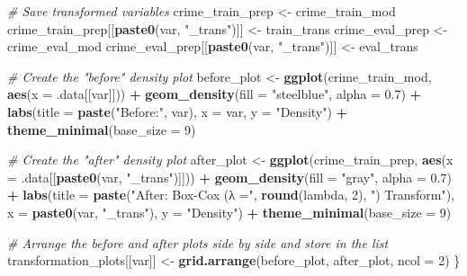 \documentclass[
]{article}
\newenvironment{Shaded}{\begin{snugshade}}{\end{snugshade}}
\newcommand{\AttributeTok}[1]{\textcolor[rgb]{0.13,0.29,0.53}{#1}}
\newcommand{\CommentTok}[1]{\textcolor[rgb]{0.56,0.35,0.01}{\textit{#1}}}
\newcommand{\DecValTok}[1]{\textcolor[rgb]{0.00,0.00,0.81}{#1}}
\newcommand{\FloatTok}[1]{\textcolor[rgb]{0.00,0.00,0.81}{#1}}
\newcommand{\FunctionTok}[1]{\textcolor[rgb]{0.13,0.29,0.53}{\textbf{#1}}}
\newcommand{\NormalTok}[1]{#1}
\newcommand{\OtherTok}[1]{\textcolor[rgb]{0.56,0.35,0.01}{#1}}
\newcommand{\SpecialCharTok}[1]{\textcolor[rgb]{0.81,0.36,0.00}{\textbf{#1}}}
\newcommand{\StringTok}[1]{\textcolor[rgb]{0.31,0.60,0.02}{#1}}
\begin{document}
\begin{Shaded}
\begin{Highlighting}[]
  \CommentTok{\# Save transformed variables}
\NormalTok{  crime\_train\_prep }\OtherTok{\textless{}{-}}\NormalTok{ crime\_train\_mod}
\NormalTok{  crime\_train\_prep[[}\FunctionTok{paste0}\NormalTok{(var, }\StringTok{"\_trans"}\NormalTok{)]] }\OtherTok{\textless{}{-}}\NormalTok{ train\_trans}
\NormalTok{  crime\_eval\_prep }\OtherTok{\textless{}{-}}\NormalTok{ crime\_eval\_mod}
\NormalTok{  crime\_eval\_prep[[}\FunctionTok{paste0}\NormalTok{(var, }\StringTok{"\_trans"}\NormalTok{)]] }\OtherTok{\textless{}{-}}\NormalTok{ eval\_trans}
  
  \CommentTok{\# Create the "before" density plot}
\NormalTok{  before\_plot }\OtherTok{\textless{}{-}} \FunctionTok{ggplot}\NormalTok{(crime\_train\_mod, }\FunctionTok{aes}\NormalTok{(}\AttributeTok{x =}\NormalTok{ .data[[var]])) }\SpecialCharTok{+}
    \FunctionTok{geom\_density}\NormalTok{(}\AttributeTok{fill =} \StringTok{"steelblue"}\NormalTok{, }\AttributeTok{alpha =} \FloatTok{0.7}\NormalTok{) }\SpecialCharTok{+}
    \FunctionTok{labs}\NormalTok{(}\AttributeTok{title =} \FunctionTok{paste}\NormalTok{(}\StringTok{"Before:"}\NormalTok{, var),}
         \AttributeTok{x =}\NormalTok{ var, }\AttributeTok{y =} \StringTok{"Density"}\NormalTok{) }\SpecialCharTok{+}
    \FunctionTok{theme\_minimal}\NormalTok{(}\AttributeTok{base\_size =} \DecValTok{9}\NormalTok{)}
  
  \CommentTok{\# Create the "after" density plot}
\NormalTok{  after\_plot }\OtherTok{\textless{}{-}} \FunctionTok{ggplot}\NormalTok{(crime\_train\_prep, }\FunctionTok{aes}\NormalTok{(}\AttributeTok{x =}\NormalTok{ .data[[}\FunctionTok{paste0}\NormalTok{(var, }\StringTok{"\_trans"}\NormalTok{)]])) }\SpecialCharTok{+}
    \FunctionTok{geom\_density}\NormalTok{(}\AttributeTok{fill =} \StringTok{"gray"}\NormalTok{, }\AttributeTok{alpha =} \FloatTok{0.7}\NormalTok{) }\SpecialCharTok{+}
    \FunctionTok{labs}\NormalTok{(}\AttributeTok{title =} \FunctionTok{paste}\NormalTok{(}\StringTok{"After: Box{-}Cox (λ ="}\NormalTok{, }\FunctionTok{round}\NormalTok{(lambda, }\DecValTok{2}\NormalTok{), }\StringTok{") Transform"}\NormalTok{),}
         \AttributeTok{x =} \FunctionTok{paste0}\NormalTok{(var, }\StringTok{"\_trans"}\NormalTok{), }\AttributeTok{y =} \StringTok{"Density"}\NormalTok{) }\SpecialCharTok{+}
    \FunctionTok{theme\_minimal}\NormalTok{(}\AttributeTok{base\_size =} \DecValTok{9}\NormalTok{)}
  
  \CommentTok{\# Arrange the before and after plots side by side and store in the list}
\NormalTok{  transformation\_plots[[var]] }\OtherTok{\textless{}{-}} \FunctionTok{grid.arrange}\NormalTok{(before\_plot, after\_plot, }\AttributeTok{ncol =} \DecValTok{2}\NormalTok{)}
\NormalTok{\}}
\end{Highlighting}
\end{Shaded}
\end{document}
